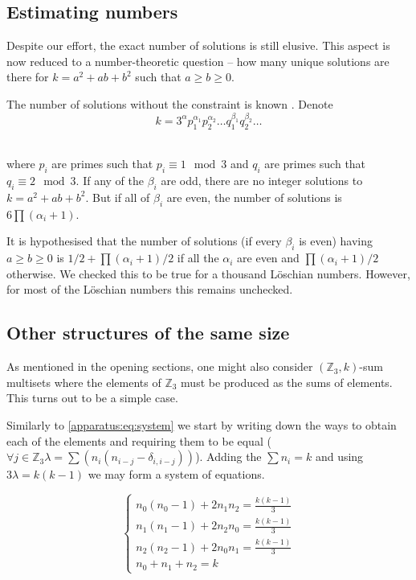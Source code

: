 \subsection{Estimating numbers}
    Despite our effort, the exact number of solutions is still elusive. This aspect is now reduced to a number-theoretic question -- how many unique solutions are there for $k=a^2+ab+b^2$ such that $a\geq b\geq 0$.

    The number of solutions without the constraint is known \cite{marmon2005hexagonal}. Denote
    \begin{equation}
        k=3^\alpha p_1^{\alpha_1}p_2^{\alpha_2}\ldots q_1^{\beta_1}q_2^{\beta_2}\ldots
    \end{equation}\
    
    where $p_i$ are primes such that $p_i \equiv 1 \mod 3$ and $q_i$ are primes such that $q_i \equiv 2 \mod 3$. If any of the $\beta_i$ are odd, there are no integer solutions to $k=a^2+ab+b^2$. But if all of $\beta_i$ are even, the number of solutions is $6\prod (\alpha_i +1)$.
    
    It is hypothesised \cite{nair2004elementary} that the number of solutions (if every $\beta_i$ is even) having $a \geq b \geq 0$ is $1/2 + \prod (\alpha_i +1)/2$ if all the $\alpha_i$ are even and $\prod (\alpha_i +1)/2$ otherwise. We checked this to be true for a thousand Löschian numbers. However, for most of the Löschian numbers this remains unchecked.

\subsection{Other structures of the same size}
    As mentioned in the opening sections, one might also consider $(\mathbb Z_3,k)$-sum multisets where the elements of $\mathbb Z_3$ must be produced as the sums of elements. This turns out to be a simple case.

    Similarly to \eqref{apparatus:eq:system} we start by writing down the ways to obtain each of the elements and requiring them to be equal ($\forall j \in \mathbb Z_3 \lambda = \sum (n_i(n_{i-j}-\delta_{i,i-j}))$). Adding the $\sum n_i = k$ and using $3\lambda = k(k-1)$ we may form a system of equations.
    
    \begin{equation}
        \label{v3:other:eq:system}
        \begin{cases}
            n_0 (n_0-1) + 2 n_1 n_2 = \frac{k(k-1)}{3} \\
            n_1 (n_1-1) + 2 n_2 n_0 = \frac{k(k-1)}{3} \\
            n_2 (n_2-1) + 2 n_0 n_1 = \frac{k(k-1)}{3} \\
            n_0 + n_1 + n_2 = k
        \end{cases}
    \end{equation}

